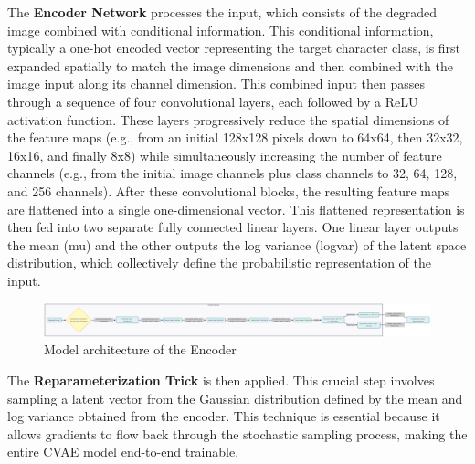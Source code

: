 \documentclass[conference]{IEEEtran}
\begin{document}
The \textbf{Encoder Network} processes the input, which consists of the degraded image combined with conditional information. This conditional information, typically a one-hot encoded vector representing the target character class, is first expanded spatially to match the image dimensions and then combined with the image input along its channel dimension. This combined input then passes through a sequence of four convolutional layers, each followed by a ReLU activation function. These layers progressively reduce the spatial dimensions of the feature maps (e.g., from an initial 128x128 pixels down to 64x64, then 32x32, 16x16, and finally 8x8) while simultaneously increasing the number of feature channels (e.g., from the initial image channels plus class channels to 32, 64, 128, and 256 channels). After these convolutional blocks, the resulting feature maps are flattened into a single one-dimensional vector. This flattened representation is then fed into two separate fully connected linear layers. One linear layer outputs the mean (mu) and the other outputs the log variance (logvar) of the latent space distribution, which collectively define the probabilistic representation of the input.
\begin{figure}[htbp]
    \centering
    \includegraphics[width=\columnwidth]{encoder.png} %
    \caption{Model architecture of the Encoder}
    \label{fig:single_column_image}
\end{figure}
The \textbf{Reparameterization Trick} is then applied. This crucial step involves sampling a latent vector from the Gaussian distribution defined by the mean and log variance obtained from the encoder. This technique is essential because it allows gradients to flow back through the stochastic sampling process, making the entire CVAE model end-to-end trainable.\cite{Kumar2020}
\end{document}
